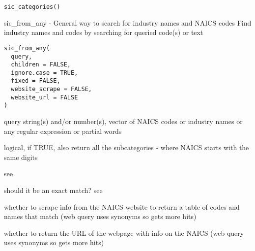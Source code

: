 \documentclass[a4paper]{book}
\begin{document}
%
\begin{Usage}
\begin{verbatim}
sic_categories()
\end{verbatim}
\end{Usage}
%
\begin{SeeAlso}\relax
{} 
\end{SeeAlso}
%
\begin{Description}\relax
sic\_from\_any - General way to search for industry names and NAICS codes
Find industry names and codes by searching for queried code(s) or text
\end{Description}
%
\begin{Usage}
\begin{verbatim}
sic_from_any(
  query,
  children = FALSE,
  ignore.case = TRUE,
  fixed = FALSE,
  website_scrape = FALSE,
  website_url = FALSE
)
\end{verbatim}
\end{Usage}
%
\begin{Arguments}
\begin{ldescription}
\item[\code{query}] query string(s) and/or number(s), vector of NAICS codes or industry names or any regular expression or partial words

\item[\code{children}] logical, if TRUE, also return all the subcategories - where NAICS starts with the same digits

\item[\code{ignore.case}] see 

\item[\code{fixed}] should it be an exact match? see 

\item[\code{website\_scrape}] whether to scrape info from the NAICS website to return a table of codes and names that match (web query uses synonyms so gets more hits)

\item[\code{website\_url}] whether to return the URL of the webpage with info on the NAICS (web query uses synonyms so gets more hits)
\end{ldescription}
\end{Arguments}
\end{document}
